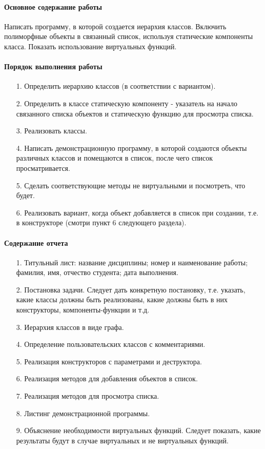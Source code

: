 \paragraph{Основное содержание работы}

Написать программу, в которой создается иерархия классов. Включить полиморфные объекты в связанный список, используя статические компоненты класса. Показать использование виртуальных функций.

\paragraph{Порядок выполнения работы}

\begin{enumerate}
    \item[1.] Определить иерархию классов (в соответствии с вариантом).
    \item[2.] Определить в классе статическую компоненту - указатель на начало связанного списка объектов и статическую функцию для просмотра списка.
    \item[3.] Реализовать классы.
    \item[4.] Написать демонстрационную программу, в которой создаются
    объекты различных классов и помещаются в список, после чего список
    просматривается.
    \item[5.] Сделать соответствующие методы не виртуальными и посмотреть, что будет.
    \item[6.] Реализовать вариант, когда объект добавляется в список при создании, т.е. в конструкторе (смотри пункт 6 следующего раздела).
\end{enumerate}

\paragraph{Содержание отчета}

\begin{enumerate}
    \item[1.] Титульный лист: название дисциплины; номер и наименование работы; фамилия, имя, отчество студента; дата выполнения.
    \item[2.] Постановка задачи. Следует дать конкретную постановку, т.е. указать, какие классы должны быть реализованы, какие должны быть в них конструкторы, компоненты-функции и т.д.
    \item[3.] Иерархия классов в виде графа.
    \item[4.] Определение пользовательских классов с комментариями.
    \item[5.] Реализация конструкторов с параметрами и деструктора.
    \item[6.] Реализация методов для добавления объектов в список.
    \item[7.] Реализация методов для просмотра списка.
    \item[8.] Листинг демонстрационной программы.
    \item[9.] Объяснение необходимости виртуальных функций. Следует показать, какие результаты будут в случае виртуальных и не виртуальных функций.
\end{enumerate}

